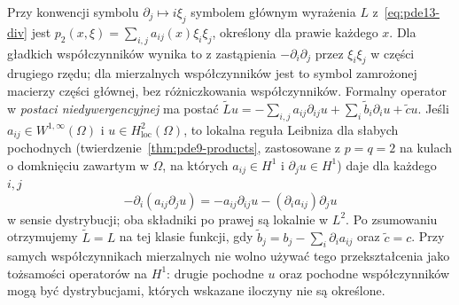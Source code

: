 \begin{definicja}
\label{def:pde13-symbol}
Przy konwencji symbolu $\partial_j\mapsto i\xi_j$ symbolem
głównym wyrażenia $L$ z~\eqref{eq:pde13-div} jest
$p_2(x,\xi)=\sum_{i,j}a_{ij}(x)\xi_i\xi_j$, określony
dla prawie każdego $x$. Dla gładkich współczynników wynika
to z zastąpienia $-\partial_i\partial_j$ przez $\xi_i\xi_j$
w części drugiego rzędu; dla mierzalnych współczynników
jest to symbol zamrożonej macierzy części głównej, bez
różniczkowania współczynników.
Formalny operator w \emph{postaci niedywergencyjnej} ma postać
$\widetilde Lu=-\sum_{i,j}a_{ij}\partial_{ij}u+
\sum_i\widetilde b_i\partial_i u+\widetilde c u$.
Jeśli $a_{ij}\in W^{1,\infty}(\Omega)$ i $u\in H^2_{\mathrm{loc}}(\Omega)$,
to lokalna reguła Leibniza dla słabych pochodnych
(twierdzenie~\ref{thm:pde9-products}, zastosowane z $p=q=2$
na kulach o domknięciu zawartym w $\Omega$, na których
$a_{ij}\in H^1$ i $\partial_j u\in H^1$) daje dla każdego $i,j$
\[
 -\partial_i(a_{ij}\partial_j u)
 =-a_{ij}\partial_{ij}u-(\partial_i a_{ij})\partial_j u
\]
w sensie dystrybucji; oba składniki po prawej są lokalnie w $L^2$.
Po zsumowaniu otrzymujemy $\widetilde L=L$ na tej klasie funkcji,
gdy $\widetilde b_j=b_j-\sum_i\partial_i a_{ij}$ oraz
$\widetilde c=c$. Przy samych współczynnikach mierzalnych
nie wolno używać tego przekształcenia jako tożsamości operatorów
na $H^1$: drugie pochodne $u$ oraz pochodne współczynników
mogą być dystrybucjami, których wskazane iloczyny nie są określone.
\end{definicja}

